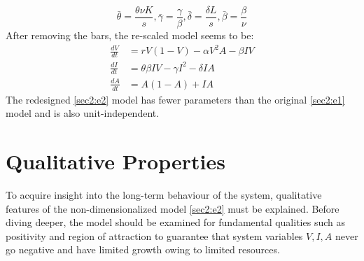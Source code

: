 \documentclass[12pt]{article}
\numberwithin{equation}{section}
\begin{document}
\begin{equation*}
 \bar \theta=\frac{\theta \nu K}{s}, \bar \gamma =\frac{\gamma}{\beta}, \bar \delta=\frac{\delta L}{s}, \bar \beta=\frac{\beta}{\nu}
\end{equation*}
After removing the bars, the re-scaled model seems to be:
 \begin{subequations}\label{sec2:e2}
	\begin{align}
	\label{sec2:e2a} \frac{dV}{dt}&=rV(1-V)-\alpha V^2A - \beta IV\\
	\label{sec2:e2b} \frac{dI}{dt}&=\theta \beta IV - \gamma I^2 - \delta IA\\
	\label{sec2:e2c} \frac{dA}{dt}&=A(1-A)+IA
	\end{align}
\end{subequations}
The redesigned \eqref{sec2:e2} model has fewer parameters than the original \eqref{sec2:e1} model and is also unit-independent.
\section{Qualitative Properties}
To acquire insight into the long-term behaviour of the system, qualitative features of the non-dimensionalized model \eqref{sec2:e2} must be explained. Before diving deeper, the model should be examined for fundamental qualities such as positivity and region of attraction to guarantee that system variables $V,I,A$ never go negative and have limited growth owing to limited resources.
\end{document}
